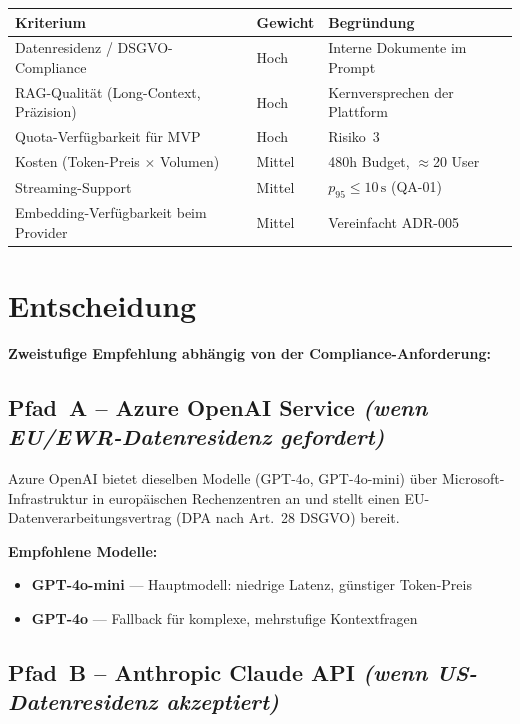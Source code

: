 \documentclass[a4paper, 11pt, oneside]{report}
\begin{document}
\begin{table}[htb]
\small\centering
\begin{tabularx}{\linewidth}{L{6cm} L{2.5cm} X}
\toprule
{}
\textbf{Kriterium} & \textbf{Gewicht} & \textbf{Begründung} \\
\midrule
Datenresidenz / DSGVO-Compliance        & Hoch   & Interne Dokumente im Prompt \\
RAG-Qualität (Long-Context, Präzision)  & Hoch   & Kernversprechen der Plattform \\
Quota-Verfügbarkeit für MVP             & Hoch   & Risiko~3 \\
Kosten (Token-Preis $\times$ Volumen)   & Mittel & 480h Budget, $\approx$20 User \\
Streaming-Support                       & Mittel & $p_{95} \leq 10\,\text{s}$ (QA-01) \\
Embedding-Verfügbarkeit beim Provider   & Mittel & Vereinfacht ADR-005 \\
\bottomrule
\end{tabularx}
\end{table}

\section{Entscheidung}

\textbf{Zweistufige Empfehlung abhängig von der Compliance-Anforderung:}

\subsection{Pfad~A -- Azure OpenAI Service \textit{(wenn EU/EWR-Datenresidenz gefordert)}}

Azure OpenAI bietet dieselben Modelle (GPT-4o, GPT-4o-mini) über
Microsoft-Infrastruktur in europäischen Rechenzentren an und stellt
einen EU-Datenverarbeitungsvertrag (DPA nach Art.~28 DSGVO) bereit.

\textbf{Empfohlene Modelle:}
\begin{itemize}
  \item \textbf{GPT-4o-mini} --- Hauptmodell: niedrige Latenz, günstiger Token-Preis
  \item \textbf{GPT-4o} --- Fallback für komplexe, mehrstufige Kontextfragen
\end{itemize}

\subsection{Pfad~B -- Anthropic Claude API \textit{(wenn US-Datenresidenz akzeptiert)}}
\end{document}
